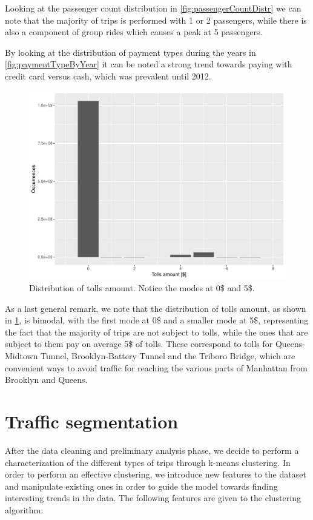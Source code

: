 \documentclass{acm_proc_article-sp-sigmod09}
\begin{document}
Looking at the passenger count distribution in \cref{fig:passengerCountDistr} we can note that the majority of trips is performed with 1 or 2 passengers, while there is also a component of group rides which causes a peak at 5 passengers.

By looking at the distribution of payment types during the years in \cref{fig:paymentTypeByYear} it can be noted a strong trend towards paying with credit card versus cash, which was prevalent until 2012.

\begin{figure}
	\centering
	\includegraphics[width=1\columnwidth]{resources/base_plots/tolls_amount_distr.pdf}
	\caption{Distribution of tolls amount. Notice the modes at 0\$ and 5\$.}
	\label{fig:tollsAmountDistr}
\end{figure}

As a last general remark, we note that the distribution of tolls amount, as shown in \cref{fig:tollsAmountDistr}, is bimodal, with the first mode at 0\$ and a smaller mode at 5\$, representing the fact that the majority of trips are not subject to tolls, while the ones that are subject to them pay on average 5\$ of tolls. These correspond to tolls for Queens-Midtown Tunnel, Brooklyn-Battery Tunnel and the Triboro Bridge, which are convenient ways to avoid traffic for reaching the various parts of Manhattan from Brooklyn and Queens.

\section{Traffic segmentation}

After the data cleaning and preliminary analysis phase, we decide to perform a characterization of the different types of trips through k-means clustering. In order to perform an effective clustering, we introduce new features to the dataset and manipulate existing ones in order to guide the model towards finding interesting trends in the data. The following features are given to the clustering algorithm:
\end{document}
